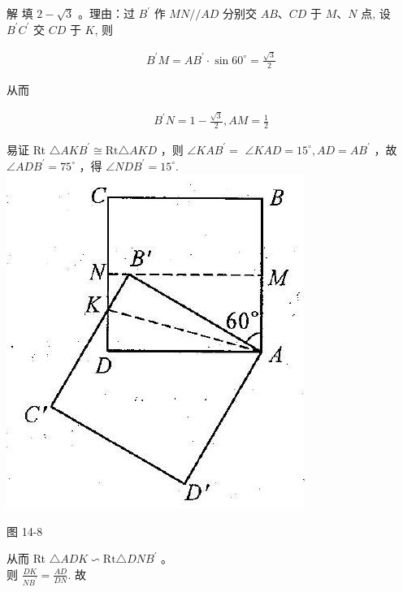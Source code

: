 \documentclass[10pt]{article}
\begin{document}
解 填 $2-\sqrt{3}$ 。理由：过 $B^{\prime}$ 作 $M N / / A D$ 分别交 $A B 、 C D$ 于 $M 、 N$ 点, 设 $B^{\prime} C^{\prime}$ 交 $C D$ 于 $K$, 则

\begin{align*}
B^{\prime} M=A B^{\prime} \cdot \sin 60^{\circ}=\frac{\sqrt{3}}{2}
\end{align*}

从而

\begin{align*}
B^{\prime} N=1-\frac{\sqrt{3}}{2}, A M=\frac{1}{2}
\end{align*}

易证 Rt $\triangle A K B^{\prime} \cong \mathrm{Rt} \triangle A K D$ ，则 $\angle K A B^{\prime}=$ $\angle K A D=15^{\circ}, A D=A B^{\prime}$ ，故 $\angle A D B^{\prime}=75^{\circ}$ ，得 $\angle N D B^{\prime}=15^{\circ}$.\\
\includegraphics[max width=\textwidth, center]{2024_10_30_2c8f45efd4a519b08e1ag-131}

图 14-8

从而 Rt $\triangle A D K \backsim \mathrm{Rt} \triangle D N B^{\prime}$ 。\\
则 $\frac{D K}{N B^{\prime}}=\frac{A D}{D N}$. 故
\end{document}
